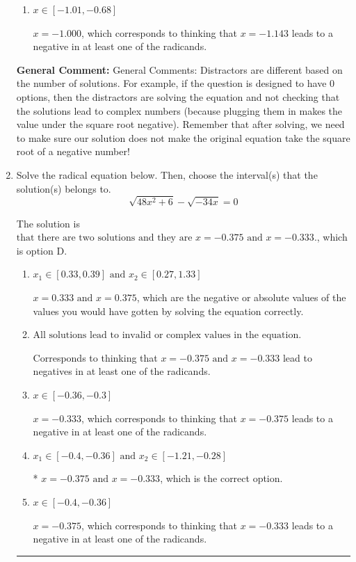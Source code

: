 \documentclass{extbook}[14pt]
\newcommand{\litem}[1]{\item #1

\rule{\textwidth}{0.4pt}}
\begin{document}
\begin{enumerate}
{\begin{enumerate}[label=\Alph*.]
$x = 1.000 \text{ and } x = 1.143$, which are the negative or absolute values of the values you would have gotten by solving the equation correctly.
\item \( x \in [-1.01,-0.68] \)

$x = -1.000$, which corresponds to thinking that $x = -1.143$ leads to a negative in at least one of the radicands.
\end{enumerate}

\textbf{General Comment:} General Comments: Distractors are different based on the number of solutions. For example, if the question is designed to have 0 options, then the distractors are solving the equation and not checking that the solutions lead to complex numbers (because plugging them in makes the value under the square root negative). Remember that after solving, we need to make sure our solution does not make the original equation take the square root of a negative number!
}
\litem{
Solve the radical equation below. Then, choose the interval(s) that the solution(s) belongs to.
\[ \sqrt{48 x^2 + 6} - \sqrt{-34 x} = 0 \]

The solution is \( \text{that there are two solutions and they are } x = -0.375 \text{ and } x = -0.333. \), which is option D.\begin{enumerate}[label=\Alph*.]
\item \( x_1 \in [0.33, 0.39] \text{ and } x_2 \in [0.27,1.33] \)

$x = 0.333 \text{ and } x = 0.375$, which are the negative or absolute values of the values you would have gotten by solving the equation correctly.
\item \( \text{All solutions lead to invalid or complex values in the equation.} \)

Corresponds to thinking that $x = -0.375 \text{ and } x = -0.333$ lead to negatives in at least one of the radicands.
\item \( x \in [-0.36,-0.3] \)

$x = -0.333$, which corresponds to thinking that $x = -0.375$ leads to a negative in at least one of the radicands.
\item \( x_1 \in [-0.4, -0.36] \text{ and } x_2 \in [-1.21,-0.28] \)

* $x = -0.375 \text{ and } x = -0.333$, which is the correct option.
\item \( x \in [-0.4,-0.36] \)

$x = -0.375$, which corresponds to thinking that $x = -0.333$ leads to a negative in at least one of the radicands.
\end{enumerate}

}
\end{enumerate}
\end{document}
